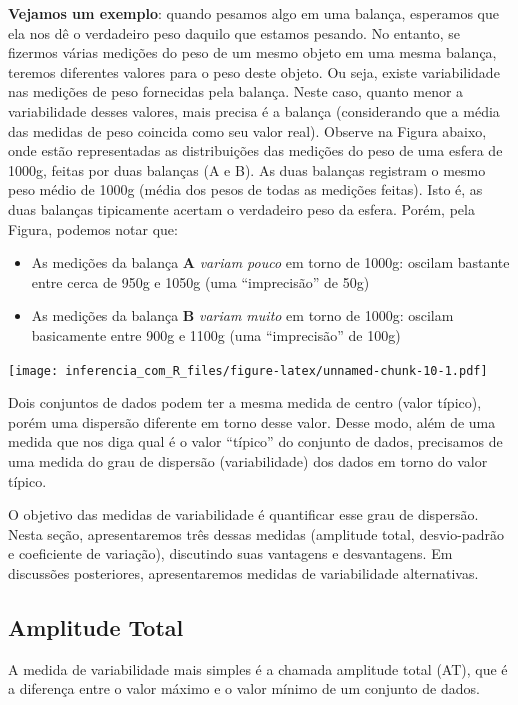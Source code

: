 \documentclass[
]{book}
\providecommand{\tightlist}{%
  \setlength{\itemsep}{0pt}\setlength{\parskip}{0pt}}
\begin{document}
\textbf{Vejamos um exemplo}: quando pesamos algo em uma balança, esperamos que ela nos dê o verdadeiro peso daquilo que estamos pesando. No entanto, se fizermos várias medições do peso de um mesmo objeto em uma mesma balança, teremos diferentes valores para o peso deste objeto. Ou seja, existe variabilidade nas medições de peso fornecidas pela balança. Neste caso, quanto menor a variabilidade desses valores, mais precisa é a balança (considerando que a média das medidas de peso coincida como seu valor real). Observe na Figura abaixo, onde estão representadas as distribuições das medições do peso de uma esfera de 1000g, feitas por duas balanças (A e B). As duas balanças registram o mesmo peso médio de 1000g (média dos pesos de todas as medições feitas). Isto é, as duas balanças tipicamente acertam o verdadeiro peso da esfera. Porém, pela Figura, podemos notar que:

\begin{itemize}
\tightlist
\item
  As medições da balança \textbf{A} \emph{variam pouco} em torno de 1000g: oscilam bastante entre cerca de 950g e 1050g (uma ``imprecisão'' de 50g)
\item
  As medições da balança \textbf{B} \emph{variam muito} em torno de 1000g: oscilam basicamente entre 900g e 1100g (uma ``imprecisão'' de 100g)
\end{itemize}

\texttt{[image: inferencia\_com\_R\_files/figure-latex/unnamed-chunk-10-1.pdf]}

Dois conjuntos de dados podem ter a mesma medida de centro (valor típico), porém uma dispersão diferente em torno desse valor. Desse modo, além de uma medida que nos diga qual é o valor ``típico'' do conjunto de dados, precisamos de uma medida do grau de dispersão (variabilidade) dos dados em torno do valor típico.

O objetivo das medidas de variabilidade é quantificar esse grau de dispersão. Nesta seção, apresentaremos três dessas medidas (amplitude total, desvio-padrão e coeficiente de variação), discutindo suas vantagens e desvantagens. Em discussões posteriores, apresentaremos medidas de variabilidade alternativas.

\hypertarget{amplitude-total}{%
\subsection{Amplitude Total}\label{amplitude-total}}

A medida de variabilidade mais simples é a chamada amplitude total (AT), que é a diferença entre o valor máximo e o valor mínimo de um conjunto de dados.
\end{document}
